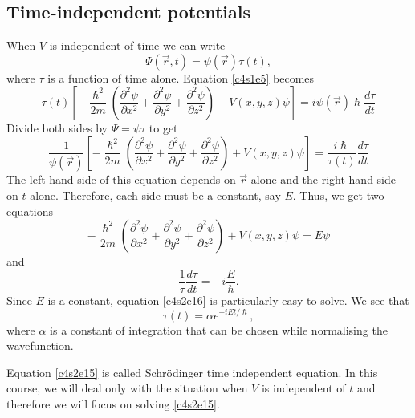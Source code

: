 \subsection{Time-independent potentials}
When $V$ is independent of time we can write
\begin{equation}\label{c4s2e12}
\Psi(\vec{r}, t) = \psi(\vec{r})\tau(t),
\end{equation}
where $\tau$ is a function of time alone. Equation \eqref{c4s1e5} becomes
\begin{equation}\label{c4s2e13}
\tau(t)\left[-\frac{\hslash^2}{2m}\left(\frac{\partial^2\psi}{\partial x^2} + 
\frac{\partial^2\psi}{\partial y^2} + \frac{\partial^2\psi}{\partial z^2}
\right) + V(x,y,z)\psi\right] = i\psi(\vec{r})\hslash\frac{d\tau}{dt}
\end{equation}
Divide both sides by $\Psi = \psi\tau$ to get
\begin{equation}\label{c4s2e14}
\frac{1}{\psi(\vec{r})}\left[-\frac{\hslash^2}{2m}\left(
\frac{\partial^2\psi}{\partial x^2} + 
\frac{\partial^2\psi}{\partial y^2} + \frac{\partial^2\psi}{\partial z^2}
\right) + V(x,y,z)\psi\right] = \frac{i\hslash}{\tau(t)}\frac{d\tau}{dt}
\end{equation}
The left hand side of this equation depends on $\vec{r}$ alone and the 
right hand side on $t$ alone. Therefore, each side must be a constant, say $E$.
Thus, we get two equations
\begin{equation}\label{c4s2e15}
-\frac{\hslash^2}{2m}\left(\frac{\partial^2\psi}{\partial x^2} + 
\frac{\partial^2\psi}{\partial y^2} + \frac{\partial^2\psi}{\partial z^2}
\right) + V(x,y,z)\psi = E\psi
\end{equation}
and
\begin{equation}\label{c4s2e16}
\frac{1}{\tau}\frac{d\tau}{dt} = -i\frac{E}{\hslash}.
\end{equation}
Since $E$ is a constant, equation \eqref{c4s2e16} is particularly easy to
solve. We see that
\begin{equation}\label{c4s2e17}
\tau(t) = \alpha e^{-iEt/\hslash},
\end{equation}
where $\alpha$ is a constant of integration that can be chosen while normalising
the wavefunction.

Equation \eqref{c4s2e15} is called  Schr\"{o}dinger time independent equation. 
In this course, we will deal only with the situation when $V$ is independent of 
$t$ and therefore we will focus on solving \eqref{c4s2e15}.

